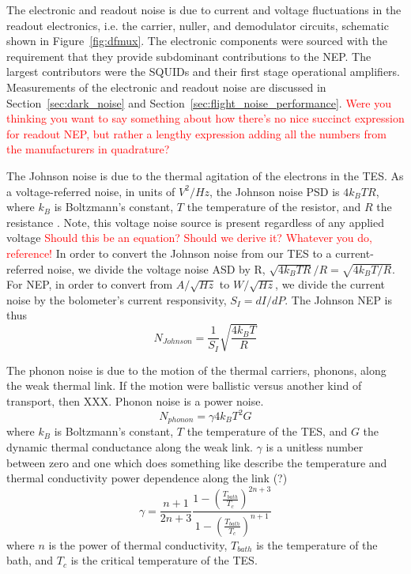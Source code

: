 The electronic and readout noise is due to current and voltage fluctuations in the readout electronics, i.e. the carrier, nuller, and demodulator circuits, schematic shown in Figure~\ref{fig:dfmux}. 
The electronic components were sourced with the requirement that they provide subdominant contributions to the \ac{NEP}. 
The largest contributors were the \ac{SQUID}s and their first stage operational amplifiers. 
Measurements of the electronic and readout noise are discussed in Section~\ref{sec:dark_noise} and Section~\ref{sec:flight_noise_performance}.
\textcolor{red}{Were you thinking you want to say something about how there's no nice succinct expression for readout \ac{NEP}, but rather a lengthy expression adding all the numbers from the manufacturers in quadrature?}

The Johnson noise is due to the thermal agitation of the electrons in the \ac{TES}. 
As a voltage-referred noise, in units of $V^2/Hz$, the Johnson noise \ac{PSD} is $4k_{B}TR$,
where $k_{B}$ is Boltzmann's constant, $T$ the temperature of the resistor, and $R$ the resistance \cite{}.
Note, this voltage noise source is present regardless of any applied voltage
\textcolor{red}{Should this be an equation? Should we derive it? Whatever you do, reference!}
In order to convert the Johnson noise from our \ac{TES} to a current-referred noise, we divide the voltage noise \ac{ASD} by R, $\sqrt{4k_{B}TR}/R = \sqrt{4k_BT/R}$. 
For \ac{NEP}, in order to convert from $A/\sqrt{Hz}$ to $W/\sqrt{Hz}$, we divide the current noise by the bolometer's current responsivity, $S_{I} = dI/dP$. 
The Johnson \ac{NEP} is thus
\begin{equation}
N_{Johnson} =  \frac{1}{S_I} \sqrt{ \frac{4k_{B}T}{R}}
\label{eq:johnson}
\end{equation}

The phonon noise is due to the motion of the thermal carriers, phonons, along the weak thermal link. 
If the motion were ballistic versus another kind of transport, then XXX. 
Phonon noise is a power noise. 
\begin{equation}
N_{phonon} = \gamma 4k_{B} T^2 G
\label{eq:phonon}
\end{equation}
where $k_{B}$ is Boltzmann's constant, $T$ the temperature of the \ac{TES}, and $G$ the dynamic thermal conductance along the weak link. 
 $\gamma$ is a unitless number between zero and one which does something like describe the temperature and thermal conductivity power dependence along the link (?)
 \begin{equation}
\gamma = \frac{n+1}{2n+3} \frac{1-\left(\frac{T_{bath}}{T_c}\right)^{2n+3}}{1-\left(\frac{T_{bath}}{T_c}\right)^{n+1}}
\label{eq:gamma}
\end{equation}
where $n$ is the power of thermal conductivity, $T_{bath}$ is the temperature of the bath, and $T_c$ is the critical temperature of the \ac{TES}.

